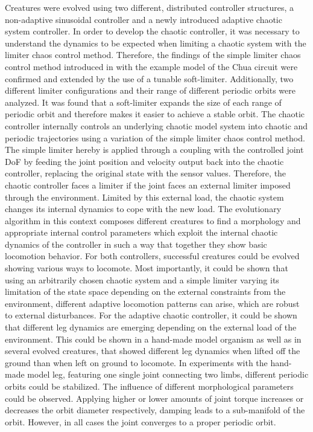 \documentclass[main]{subfiles}
\begin{document}
Creatures were evolved using two different, distributed controller structures, a non-adaptive sinusoidal controller and a newly introduced adaptive chaotic system controller. %
%
In order to develop the chaotic controller, it was necessary to understand the dynamics to be expected when limiting a chaotic system with the limiter chaos control method. %
%
Therefore, the findings of the simple limiter chaos control method introduced in \cite{bib:Corron2000} with the example model of the Chua circuit \cite{bib:Matsumoto1985} were confirmed and extended by the use of a tunable soft-limiter. %
%
Additionally, two different limiter configurations and their range of different periodic orbits were analyzed. %
%
It was found that a soft-limiter expands the size of each range of periodic orbit and therefore makes it easier to achieve a stable orbit. %
%
The chaotic controller internally controls an underlying chaotic model system into chaotic and periodic trajectories using a variation of the simple limiter chaos control method. %
%
The simple limiter hereby is applied through a coupling with the controlled joint DoF by feeding the joint position and velocity output back into the chaotic controller, replacing the original state with the sensor values. %
%
Therefore, the chaotic controller faces a limiter if the joint faces an external limiter imposed through the environment. %
%
Limited by this external load, the chaotic system changes its internal dynamics to cope with the new load. %
%
The evolutionary algorithm in this context composes different creatures to find a morphology and appropriate internal control parameters which exploit the internal chaotic dynamics of the controller in such a way that together they show basic locomotion behavior. %
%
For both controllers, successful creatures could be evolved showing various ways to locomote. %
%
Most importantly, it could be shown that using an arbitrarily chosen chaotic system and a simple limiter varying its limitation of the state space depending on the external constraints from the environment, different adaptive locomotion patterns can arise, which are robust to external disturbances. %
%
For the adaptive chaotic controller, it could be shown that different leg dynamics are emerging depending on the external load of the environment. %
%
This could be shown in a hand-made model organism as well as in several evolved creatures, that showed different leg dynamics when lifted off the ground than when left on ground to locomote. %
%
In experiments with the hand-made model leg, featuring one single joint connecting two limbs, different periodic orbits could be stabilized. %
%
The influence of different morphological parameters could be observed. %
%
Applying higher or lower amounts of joint torque increases or decreases the orbit diameter respectively, damping leads to a sub-manifold of the orbit. %
%
However, in all cases the joint converges to a proper periodic orbit.
\end{document}
